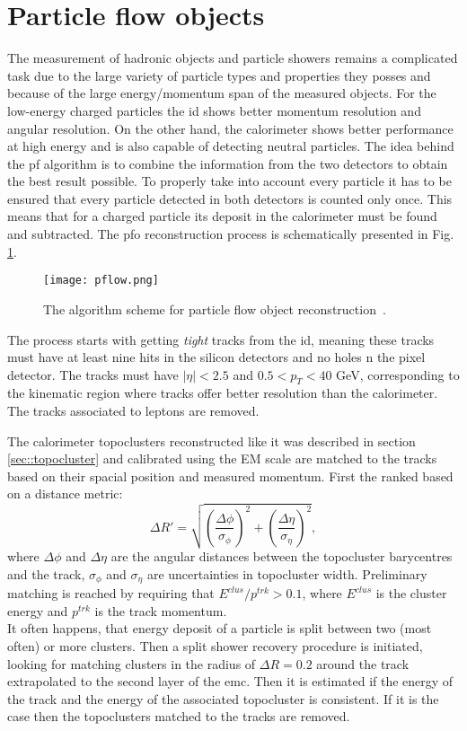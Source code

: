       \section{Particle flow objects}
      \label{sec:pfo}
      The measurement of hadronic objects and particle showers remains a complicated task due to the large variety of particle types and properties they posses and because of the large energy/momentum span of the measured objects. For the low-energy charged particles the \gls{id} shows better momentum resolution and angular resolution. On the other hand, the calorimeter shows better performance at high energy and is also capable of detecting neutral particles. The idea behind the \gls{pf} algorithm \cite{pflow} is to combine the information from the two detectors to obtain the best result possible. To properly take into account every particle it has to be ensured that every particle detected in both detectors is counted only once. This means that for a charged particle its deposit in the calorimeter must be found and subtracted. The \gls{pfo} reconstruction process is schematically presented in Fig. \ref{fig::pflow}.
      	\begin{figure}[htbp]
      	\centering
      	\texttt{[image: pflow.png]}
      	\caption[Particle flow algorithm]{The algorithm scheme for particle flow object reconstruction~\cite{pflow}.}
      	\label{fig::pflow}
      \end{figure}
  	  The process starts with getting \textit{tight} tracks from the \gls{id}, meaning these tracks must have at least nine hits in the silicon detectors and no holes n the pixel detector. The tracks must have $|\eta| < 2.5$ and $0.5 < p_T < 40$ GeV, corresponding to the kinematic region where tracks offer better resolution than the calorimeter. The tracks associated to leptons are removed. 
  	  
  	  The calorimeter topoclusters reconstructed like it was described in section \ref{sec::topocluster} and calibrated using the EM scale are matched to the tracks based on their spacial position and measured momentum. First the ranked based on a distance metric:
  	  	\begin{equation}
  	  \Delta R'=\sqrt{\left(\frac{\Delta \phi}{\sigma_{\phi}}\right)^2+\left(\frac{\Delta \eta}{\sigma_{\eta}}\right)^2},
  	  \end{equation}
  	  where $\Delta \phi$ and $\Delta \eta$ are the angular distances between the topocluster barycentres and the track, $\sigma_{\phi}$ and $\sigma_{\eta}$ are uncertainties in topocluster width. Preliminary matching is reached by requiring that $E^{clus}/p^{trk}>0.1$, where $E^{clus}$ is the cluster energy and $p^{trk}$ is the track momentum.\\
  	  It often happens, that energy deposit of a particle is split between two (most often) or more clusters. Then a split shower recovery procedure is initiated, looking for matching clusters in the radius of $\Delta R = 0.2$ around the track extrapolated to the second layer of the \gls{emc}. Then it is estimated if the energy of the track and the energy of the associated topocluster is consistent. If it is the case then the topoclusters matched to the tracks are removed. 
  	  
